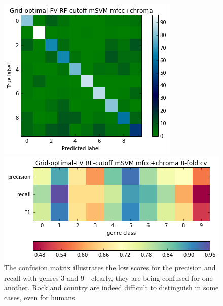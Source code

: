 \documentclass{article}
\begin{document}
\begin{figure}[H]
    \centering
    
    \begin{minipage}[b]{0.4\textwidth}
        \includegraphics[width=\textwidth]{final-confusion.png}
    \end{minipage}
    \hfill
    \begin{minipage}[b]{0.4\textwidth}
        \includegraphics[width=\textwidth]{prf.png}
    \end{minipage}
    \label{fig:finalconf}
    \caption{The confusion matrix illustrates the low scores for the precision and recall with genres 3 and 9 - clearly, they are being confused for one another. Rock and country are indeed difficult to distinguish in some cases, even for humans.}
\end{figure}
\end{document}

